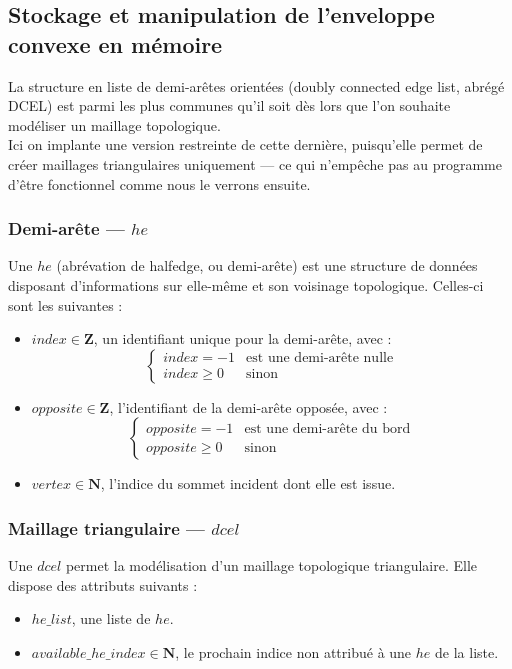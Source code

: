 \documentclass[]{article}
\begin{document}
\subsection{Stockage et manipulation de l'enveloppe convexe en mémoire}
La structure en liste de demi-arêtes orientées (doubly connected edge list, abrégé DCEL) est parmi les plus communes qu'il soit dès lors que l'on souhaite modéliser un maillage topologique.\\
Ici on implante une version restreinte de cette dernière, puisqu'elle permet de créer maillages triangulaires uniquement — ce qui n'empêche pas au programme d'être fonctionnel comme nous le verrons ensuite.

\subsubsection*{Demi-arête — $he$}
Une $he$ (abrévation de halfedge, ou demi-arête) est une structure de données disposant d'informations sur elle-même et son voisinage topologique. Celles-ci sont les suivantes :
\begin{itemize}
	\item $index \in \mathbf{Z}$, un identifiant unique pour la demi-arête, avec :
	      \[
		      \left\{
		      \begin{array}{ll}
			      index = -1   & \mbox{est une demi-arête nulle} \\
			      index \geq 0 & \mbox{sinon}
		      \end{array}
		      \right.
	      \]
	\item $opposite \in \mathbf{Z}$, l'identifiant de la demi-arête opposée, avec :
	      \[
		      \left\{
		      \begin{array}{ll}
			      opposite = -1   & \text{est une demi-arête du bord} \\
			      opposite \geq 0 & \text{sinon}
		      \end{array}
		      \right.
	      \]
	\item $vertex \in \mathbf{N}$, l'indice du sommet incident dont elle est issue.
\end{itemize}

\subsubsection*{Maillage triangulaire — $dcel$}
Une $dcel$ permet la modélisation d'un maillage topologique triangulaire. Elle dispose des attributs suivants :
\begin{itemize}
	\item $he\_list$, une liste de $he$.
	\item $available\_he\_index \in \mathbf{N}$, le prochain indice non attribué à une $he$ de la liste.
\end{itemize}
\end{document}
